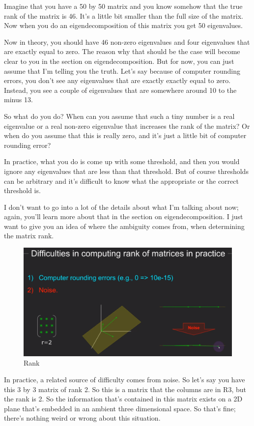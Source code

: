 \documentclass[fleqn,10pt]{olplainarticle}
\theoremstyle{definition}
\theoremstyle{remark}
\begin{document}
Imagine that you have a 50 by 50 matrix and you know somehow that the true rank of the matrix is 46. It's a little bit smaller than the full size of the matrix. Now when you do an eigendecomposition of this matrix you get 50 eigenvalues.

Now in theory, you should have 46 non-zero eigenvalues and four eigenvalues that are exactly equal to zero. The reason why that should be the case will become clear to you in the section on eigendecomposition. But for now, you can just assume that I'm telling you the truth. Let's say because of computer rounding errors, you don't see any eigenvalues that are exactly exactly equal to zero. Instead, you see a couple of eigenvalues that are somewhere around 10 to the minus 13.

So what do you do? When can you assume that such a tiny number is a real eigenvalue or a real non-zero eigenvalue that increases the rank of the matrix? Or when do you assume that this is really zero, and it's just a little bit of computer rounding error?

In practice, what you do is come up with some threshold, and then you would ignore any eigenvalues that are less than that threshold. But of course thresholds can be arbitrary and it's difficult to know what the appropriate or the correct threshold is.

I don't want to go into a lot of the details about what I'm talking about now; again, you'll learn more about that in the section on eigendecomposition. I just want to give you an idea of where the ambiguity comes from, when determining the matrix rank.

\begin{figure}[ht]
	\centering
	\includegraphics[width=0.5\linewidth]{images/rank-17.png}
	\caption{Rank}
	\label{fig:rank_17}
\end{figure}

In practice, a related source of difficulty comes from noise. So let's say you have this 3 by 3 matrix of rank 2. So this is a matrix that the columns are in R3, but the rank is 2. So the information that's contained in this matrix exists on a 2D plane that's embedded in an ambient three dimensional space. So that's fine; there's nothing weird or wrong about this situation.
\end{document}
